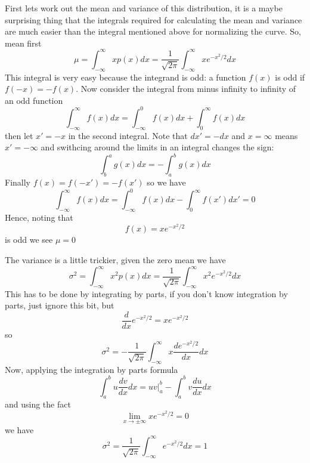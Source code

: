 \documentclass[11pt,a4paper]{scrartcl}
\begin{document}
First lets work out the mean and variance of this distribution, it is
a maybe surprising thing that the integrals required for calculating
the mean and variance are much easier than the integral mentioned
above for normalizing the curve. So, mean first
\begin{equation}
\mu=\int_{-\infty}^\infty xp(x)dx =\frac{1}{\sqrt{2\pi}}\int_{-\infty}^\infty xe^{-x^2/2}dx
\end{equation}
This integral is very easy because the integrand is odd: a function $f(x)$ is odd if $f(-x)=-f(x)$. Now consider the integral from minus infinity to infinity of an odd function
\begin{equation}
\int_{-\infty}^\infty f(x)dx=\int_{-\infty}^0 f(x)dx+\int_0^\infty f(x)dx
\end{equation}
then let $x'=-x$ in the second integral. Note that $dx'=-dx$ and $x=\infty$ means $x'=-\infty$ and swithcing around the limits in an integral changes the sign:
\begin{equation}
\int_b^a g(x)dx=-\int_a^b g(x)dx
\end{equation}
Finally $f(x)=f(-x')=-f(x')$ so we have
\begin{equation}
\int_{-\infty}^\infty f(x)dx=\int_{-\infty}^0 f(x)dx-\int_0^{\infty} f(x')dx'=0
\end{equation}
Hence, noting that 
\begin{equation}
f(x)=xe^{-x^2/2}
\end{equation}
is odd we see $\mu=0$

The variance is a little trickier, given the zero mean we have
\begin{equation}
\sigma^2=\int_{-\infty}^\infty x^2p(x)dx =\frac{1}{\sqrt{2\pi}}\int_{-\infty}^\infty x^2e^{-x^2/2}dx
\end{equation}
This has to be done by integrating by parts, if you don't know integration by parts, just ignore this bit, but
\begin{equation}
\frac{d}{dx}e^{-x^2/2}=xe^{-x^2/2}
\end{equation}
so
\begin{equation}
\sigma^2=-\frac{1}{\sqrt{2\pi}}\int_{-\infty}^\infty x\frac{de^{-x^2/2}}{dx}dx
\end{equation}
Now, applying the integration by parts formula
\begin{equation}
\int_a^b u\frac{dv}{dx}dx=uv|_a^b-\int_a^b v\frac{du}{dx}dx
\end{equation}
and using the fact 
\begin{equation}
\lim_{x\rightarrow \pm \infty} xe^{-x^2/2}=0
\end{equation}
we have 
\begin{equation}
\sigma^2=\frac{1}{\sqrt{2\pi}}\int_{-\infty}^\infty e^{-x^2/2}dx=1
\end{equation}
\end{document}
